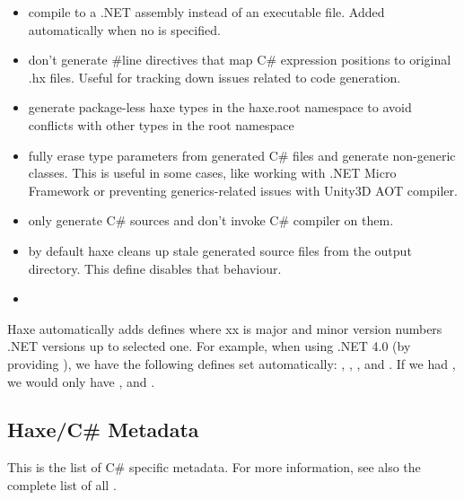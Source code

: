 \begin{itemize}
	\item {} compile to a .NET assembly instead of an executable file. Added automatically when no  is specified.
	\item {} don't generate #line directives that map C# expression positions to original .hx files. Useful for tracking down issues related to code generation.
	\item {} generate package-less haxe types in the haxe.root namespace to avoid conflicts with other types in the root namespace
	\item {} fully erase type parameters from generated C# files and generate non-generic classes. This is useful in some cases, like working with .NET Micro Framework or preventing generics-related issues with Unity3D AOT compiler.
	\item {} only generate C# sources and don't invoke C# compiler on them.
	\item {} by default haxe cleans up stale generated source files from the output directory. This define disables that behaviour.
	\item {}
\end{itemize}
	
Haxe automatically adds  defines where xx is major and minor version numbers .NET versions up to selected one. For example, when using .NET 4.0 (by providing ), we have the following defines set automatically: , , ,  and . If we had , we would only have ,  and .

\subsection{Haxe/C# Metadata}
\label{target-cs-metadata}

This is the list of C# specific metadata. For more information, see also the complete list of all .

